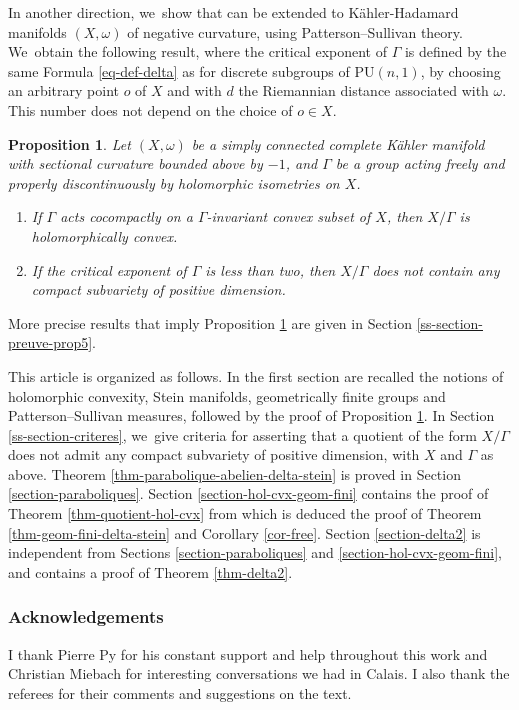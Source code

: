 \documentclass[JEP,XML,SOM,Unicode,NoEqCountersInSection,published]{cedram}
\newtheorem{propositionIntro}[theoremIntro]{Proposition}
\theoremstyle{definition}
\newcommand{\PU}{\mathrm{PU}}
\newcommand{\PU}{\mathrm{PU}}
\begin{document}
In another direction, we~show that \cite[Th.\,1]{deyNoteComplexhyperbolicKleinian2020} can be extended to Kähler-Hadamard manifolds $(X,\omega)$ of negative curvature, using Patterson--Sullivan theory. We~obtain the following result, where the critical exponent of $\Gamma$ is defined by the same Formula \eqref{eq-def-delta} as for discrete subgroups of $\PU(n,1)$, by choosing an arbitrary point $o$ of $X$ and with $d$ the Riemannian distance associated with $\omega$. This number does not depend on the choice of $o\in X$.

\begin{propositionIntro}\label{prop-KH-general}
Let $(X,\omega)$ be a simply connected complete Kähler manifold with sectional curvature bounded above by $-1$, and $\Gamma$ be a group acting freely and properly discontinuously by holomorphic isometries on $X$.
\begin{enumerate}
\item If $\Gamma$ acts cocompactly on a $\Gamma$\nobreakdash-invariant convex subset of $X$, then $X/\Gamma$ is holomorphically convex.
\item If the critical exponent of $\Gamma$ is less than two, then $X/\Gamma$ does not contain any compact subvariety of positive dimension.
\end{enumerate}
\end{propositionIntro}

\noindent More precise results that imply Proposition \ref{prop-KH-general} are given in Section \ref{ss-section-preuve-prop5}.

This article is organized as follows. In the first section are recalled the notions of holomorphic convexity, Stein manifolds, geometrically finite groups and Patterson--Sullivan measures, followed by the proof of Proposition \ref{prop-KH-general}. In Section \ref{ss-section-criteres}, we~give criteria for asserting that a quotient of the form $X/\Gamma$ does not admit any compact subvariety of positive dimension, with $X$ and $\Gamma$ as above. Theorem \ref{thm-parabolique-abelien-delta-stein} is proved in Section \ref{section-paraboliques}. Section \ref{section-hol-cvx-geom-fini} contains the proof of Theorem \ref{thm-quotient-hol-cvx} from which is deduced the proof of Theorem \ref{thm-geom-fini-delta-stein} and Corollary \ref{cor-free}. Section \ref{section-delta2} is independent from Sections \ref{section-paraboliques} and \ref{section-hol-cvx-geom-fini}, and contains a proof of Theorem \ref{thm-delta2}.

\subsubsection*{Acknowledgements}
I thank Pierre Py for his constant support and help throughout this work and Christian Miebach for interesting conversations we had in Calais. I also thank the referees for their comments and suggestions on the text.
\end{document}
